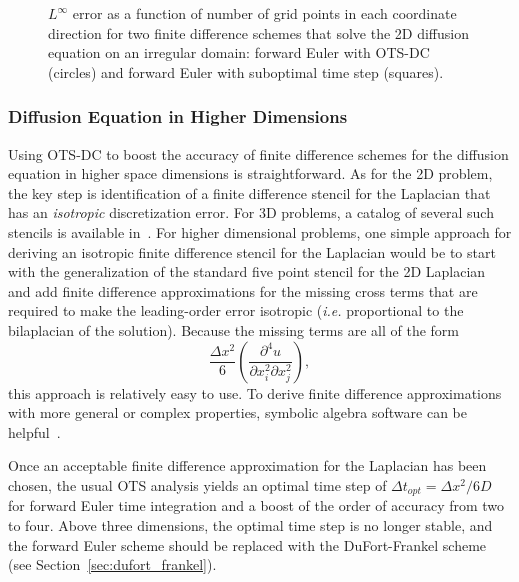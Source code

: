 \documentclass[fleqn,12pt,twoside]{article}
\newcommand{\beq}{\begin{equation}}
\newcommand{\eeq}{\end{equation}}
\def\dt{\Delta t}
\def\dx{\Delta x}
\def\ie{\emph{i.e. }}
\begin{document}
\begin{figure}[tb]
\begin{center}
\caption{$L^\infty$ error as a function of number of grid points in each
coordinate direction for two finite difference schemes that solve the 2D 
diffusion equation on an irregular domain: forward Euler with OTS-DC 
(circles) and forward Euler with suboptimal time step (squares).  
}
\label{fig:diffusion_eqn_2d_starfish_error}
\end{center}
\end{figure}


\subsubsection{Diffusion Equation in Higher Dimensions}
Using OTS-DC to boost the accuracy of finite difference
schemes for the diffusion equation in higher space dimensions is 
straightforward.  As for the 2D problem, the key step is identification of a 
finite difference stencil for the Laplacian that has an \emph{isotropic} 
discretization error.  For 3D problems, a catalog of several such stencils is 
available in~\cite{patra_2005}.   For higher dimensional problems, one simple
approach for deriving an isotropic finite difference stencil for the Laplacian
would be to start with the generalization of the standard five point stencil
for the 2D Laplacian and add finite difference approximations for the missing 
cross terms that are required to make the leading-order error isotropic 
(\ie proportional to the bilaplacian of the solution).  Because the missing 
terms are all of the form 
\beq
\frac{\dx^2}{6} \left(\frac{\partial^4 u}{\partial x_i^2 \partial x_j^2}\right),
\eeq
this approach is relatively easy to use.  To derive finite difference 
approximations with more general or complex properties, symbolic algebra 
software can be helpful~\cite{patra_2005,gupta_1998}.  

Once an acceptable finite difference approximation for the Laplacian has been 
chosen, the usual OTS analysis yields an optimal time step of 
$\dt_{opt} = \dx^2/6D$ for forward Euler time integration and a boost of the 
order of accuracy from two to four.  Above three dimensions, the optimal
time step is no longer stable, and the forward Euler scheme should be replaced
with the DuFort-Frankel scheme (see Section~\ref{sec:dufort_frankel}).
\end{document}
